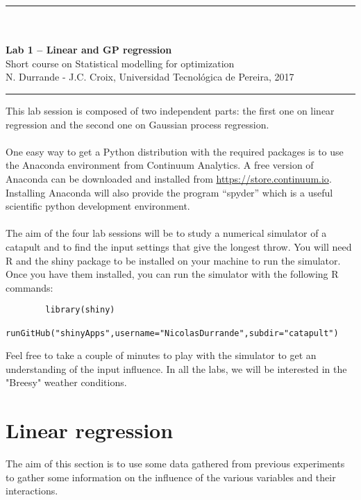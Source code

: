 \documentclass[12pt]{scrartcl}
\begin{document}
\begin{center}
	\rule{\textwidth}{1pt}
	\\ \ \\
	{\LARGE \textbf{Lab 1 -- Linear and GP regression}}\\
	\vspace{3mm}
	{\large Short course on Statistical modelling for optimization\\ \vspace{3mm}}
	{\normalsize N. Durrande - J.C. Croix, Universidad Tecnol\'ogica de Pereira, 2017}\\
	\vspace{3mm}
	\rule{\textwidth}{1pt}
	\vspace{5mm}
\end{center}
This lab session is composed of two independent parts: the first one on linear regression and the second one on Gaussian process regression.

\paragraph{}
\noindent One easy way to get a Python distribution with the required packages is to use the Anaconda environment from Continuum Analytics.
A free version of Anaconda can be downloaded and installed from  \url{https://store.continuum.io}. Installing Anaconda will also provide the program ``spyder'' which is a useful scientific python development environment.

\paragraph{}
\noindent
The aim of the four lab sessions will be to study a numerical simulator of a catapult and to find the input settings that give the longest throw. You will need R and the shiny package to be installed on your machine to run the simulator. Once you have them installed, you can run the simulator with the following R commands:
\begin{verbatim}
		library(shiny)
		runGitHub("shinyApps",username="NicolasDurrande",subdir="catapult")
\end{verbatim}
Feel free to take a couple of minutes to play with the simulator to get an understanding of the input influence. In all the labs, we will be interested in the "Breesy" weather conditions.

\section{Linear regression}
The aim of this section is to use some data gathered from previous experiments to gather some information on the influence of the various variables and their interactions.
\end{document}
